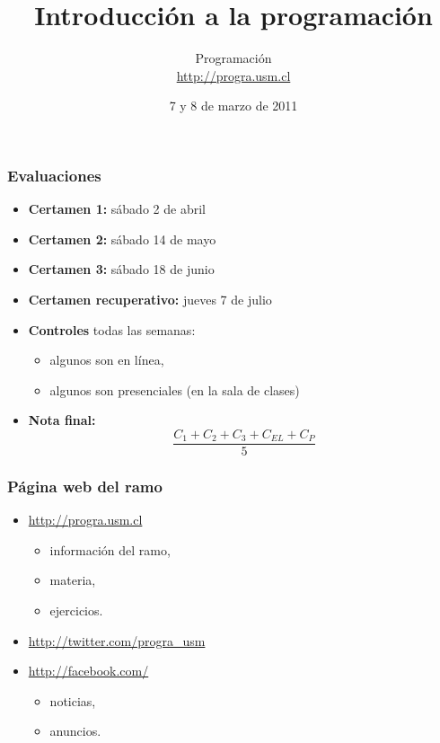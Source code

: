 \documentclass[12pt]{beamer}
\title{Introducción a la programación}
\author{
  Programación \\ \url{http://progra.usm.cl}
}
\date{7 y 8 de marzo de 2011}
\begin{document}
  \begin{frame}
    \maketitle
  \end{frame}

  \begin{frame}
    \frametitle{Evaluaciones}
    \begin{itemize}
      \item \textbf{Certamen 1:} sábado  2 de abril
      \item \textbf{Certamen 2:} sábado 14 de mayo
      \item \textbf{Certamen 3:} sábado 18 de junio
      \item \textbf{Certamen recuperativo:} jueves 7 de julio
      \vfill
      \item \textbf{Controles} \alert{todas las semanas}:
      \begin{itemize}
        \item algunos son en línea,
        \item algunos son presenciales (en la sala de clases)
      \end{itemize}
      \vfill
      \item \textbf{Nota final:}
        \[ \frac{C_1 + C_2 + C_3 + C_{EL} + C_P}{5} \]
    \end{itemize}
  \end{frame}

  \begin{frame}
    \frametitle{Página web del ramo}
    \begin{itemize}
      \item \url{http://progra.usm.cl}
        \begin{itemize}
          \item información del ramo,
          \item materia,
          \item ejercicios.
        \end{itemize}
      \vfill
      \item \url{http://twitter.com/progra_usm}
      \item \url{http://facebook.com/}
        \begin{itemize}
          \item noticias,
          \item anuncios.
        \end{itemize}
    \end{itemize}
  \end{frame}
\end{document}
